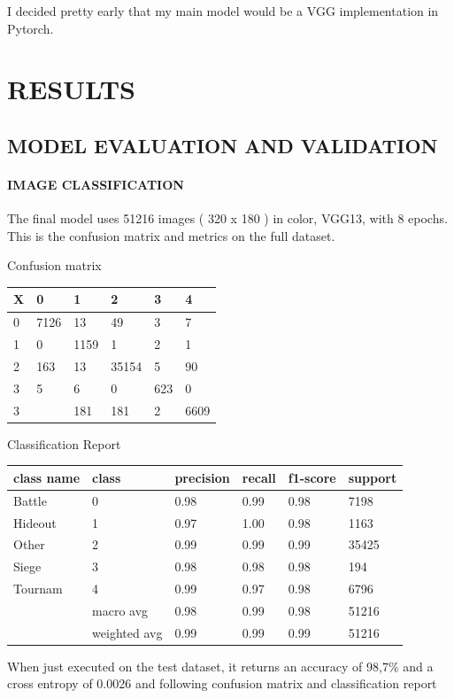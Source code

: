 \documentclass[
]{article}
\begin{document}
I decided pretty early that my main model would be a VGG implementation
in Pytorch.

\hypertarget{results}{%
\section{RESULTS}\label{results}}

\hypertarget{model-evaluation-and-validation}{%
\subsection{MODEL EVALUATION AND
VALIDATION}\label{model-evaluation-and-validation}}

\hypertarget{image-classification}{%
\paragraph{IMAGE CLASSIFICATION}\label{image-classification}}

The final model uses 51216 images ( 320 x 180 ) in color, VGG13, with 8
epochs. This is the confusion matrix and metrics on the full dataset.

Confusion matrix

\begin{longtable}[]{@{}llllll@{}}
\toprule
X & 0 & 1 & 2 & 3 & 4\tabularnewline
\midrule
\endhead
0 & 7126 & 13 & 49 & 3 & 7\tabularnewline
1 & 0 & 1159 & 1 & 2 & 1\tabularnewline
2 & 163 & 13 & 35154 & 5 & 90\tabularnewline
3 & 5 & 6 & 0 & 623 & 0\tabularnewline
3 & & 181 & 181 & 2 & 6609\tabularnewline
\bottomrule
\end{longtable}

Classification Report

\begin{longtable}[]{@{}llllll@{}}
\toprule
class name & class & precision & recall & f1-score &
support\tabularnewline
\midrule
\endhead
Battle & 0 & 0.98 & 0.99 & 0.98 & 7198\tabularnewline
Hideout & 1 & 0.97 & 1.00 & 0.98 & 1163\tabularnewline
Other & 2 & 0.99 & 0.99 & 0.99 & 35425\tabularnewline
Siege & 3 & 0.98 & 0.98 & 0.98 & 194\tabularnewline
Tournam & 4 & 0.99 & 0.97 & 0.98 & 6796\tabularnewline
& macro avg & 0.98 & 0.99 & 0.98 & 51216\tabularnewline
& weighted avg & 0.99 & 0.99 & 0.99 & 51216\tabularnewline
\bottomrule
\end{longtable}

When just executed on the test dataset, it returns an accuracy of 98,7\%
and a cross entropy of 0.0026 and following confusion matrix and
classification report
\end{document}

